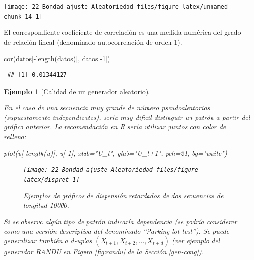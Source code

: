 \documentclass[
]{book}
\newenvironment{Shaded}{\begin{snugshade}}{\end{snugshade}}
\newcommand{\AttributeTok}[1]{\textcolor[rgb]{0.77,0.63,0.00}{#1}}
\newcommand{\DecValTok}[1]{\textcolor[rgb]{0.00,0.00,0.81}{#1}}
\newcommand{\FunctionTok}[1]{\textcolor[rgb]{0.00,0.00,0.00}{#1}}
\newcommand{\NormalTok}[1]{#1}
\newcommand{\SpecialCharTok}[1]{\textcolor[rgb]{0.00,0.00,0.00}{#1}}
\newcommand{\StringTok}[1]{\textcolor[rgb]{0.31,0.60,0.02}{#1}}
\theoremstyle{break}
\newtheorem{example}{Ejemplo}[chapter]
\theoremstyle{nonumberplain}
\begin{document}
\begin{center}\texttt{[image: 22-Bondad\_ajuste\_Aleatoriedad\_files/figure-latex/unnamed-chunk-14-1]} \end{center}

El correspondiente coeficiente de correlación es una medida numérica
del grado de relación lineal (denominado autocorrelación de orden 1).

\begin{Shaded}
\begin{Highlighting}[]
\FunctionTok{cor}\NormalTok{(datos[}\SpecialCharTok{{-}}\FunctionTok{length}\NormalTok{(datos)], datos[}\SpecialCharTok{{-}}\DecValTok{1}\NormalTok{])}
\end{Highlighting}
\end{Shaded}

\begin{verbatim}
 ## [1] 0.01344127
\end{verbatim}

\begin{example}[Calidad de un generador aleatorio]
\protect\hypertarget{exm:ret-gen}{}\label{exm:ret-gen}

En el caso de una secuencia muy grande de número pseudoaleatorios (supuestamente independientes), sería muy dificil distinguir un patrón a partir del gráfico anterior. La recomendación en R sería utilizar puntos con color de relleno:

\begin{Shaded}
\begin{Highlighting}[]
\FunctionTok{plot}\NormalTok{(u[}\SpecialCharTok{{-}}\FunctionTok{length}\NormalTok{(u)], u[}\SpecialCharTok{{-}}\DecValTok{1}\NormalTok{], }\AttributeTok{xlab=}\StringTok{"U\_t"}\NormalTok{, }\AttributeTok{ylab=}\StringTok{"U\_t+1"}\NormalTok{, }\AttributeTok{pch=}\DecValTok{21}\NormalTok{, }\AttributeTok{bg=}\StringTok{"white"}\NormalTok{)}
\end{Highlighting}
\end{Shaded}

\begin{figure}[!htb]

{\centering \texttt{[image: 22-Bondad\_ajuste\_Aleatoriedad\_files/figure-latex/dispret-1]} 

}

\caption{Ejemplos de gráficos de dispensión retardados de dos secuencias de longitud 10000.}\label{fig:dispret}
\end{figure}

Si se observa algún tipo de patrón indicaría dependencia (se podría considerar como una versión descriptiva del denominado ``Parking lot test'').
Se puede generalizar también a \(d\)-uplas \((X_{t+1},X_{t+2},\ldots,X_{t+d})\)
(ver ejemplo del generador RANDU en Figura \ref{fig:randu} de la Sección \ref{gen-cong}).
\end{example}
\end{document}
